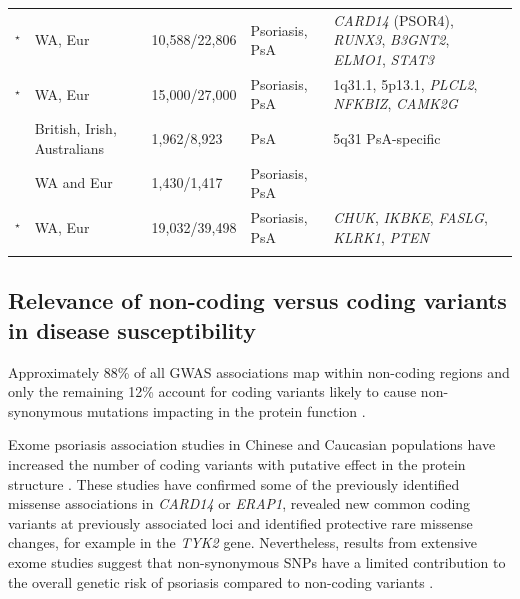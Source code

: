 \begin{landscape}
\begin{center}
\begin{longtable}[ht]{p{.25\textheight} p{.25\textheight} p{.20\textheight} p{.20\textheight} p{.50\textheight}}
\parencite{Tsoi2012}$^\star$ & WA, Eur & 10,588/22,806 & Psoriasis, PsA & \textit{CARD14} (PSOR4), \textit{RUNX3}, \textit{B3GNT2}, \textit{ELMO1}, \textit{STAT3} \\

\parencite{Tsoi2015}$^\star$	& WA, Eur	& 15,000/27,000	& Psoriasis, PsA	& 1q31.1, 5p13.1, \textit{PLCL2}, \textit{NFKBIZ}, \textit{CAMK2G} \\

\parencite{Bowes2015} &	British, Irish, Australians	& 1,962/8,923	& PsA	& 5q31 PsA-specific \\

\parencite{Stuart2015} &	WA and Eur	& 1,430/1,417	& Psoriasis, PsA	& \\

\parencite{Tsoi2017}$^\star$ &	WA, Eur	& 19,032/39,498	& Psoriasis, PsA	& \textit{CHUK}, \textit{IKBKE}, \textit{FASLG}, \textit{KLRK1}, \textit{PTEN} \\																		
\bottomrule
\medskip
\end{longtable}
\end{center}
\end{landscape}



\subsection{Relevance of non-coding versus coding variants in disease susceptibility}

Approximately 88\% of all GWAS associations map within non-coding regions and only the remaining 12\% account for coding variants likely to cause non-synonymous mutations impacting in the protein function \parencite{Welter2013}.

Exome psoriasis association studies in Chinese and Caucasian populations have increased the number of coding variants with putative effect in the protein structure \parencite{Tang2014,Zuo2015,Dand2017}. These studies have confirmed some of the previously identified missense associations in \textit{CARD14} or \textit{ERAP1}, revealed new common coding variants at previously associated loci and identified protective rare missense changes, for example in the \textit{TYK2} gene\parencite{Tang2014,Dand2017}. Nevertheless, results from extensive exome studies suggest that non-synonymous SNPs have a limited contribution to the overall genetic risk of psoriasis compared to non-coding variants \parencite{Tang2014}.

